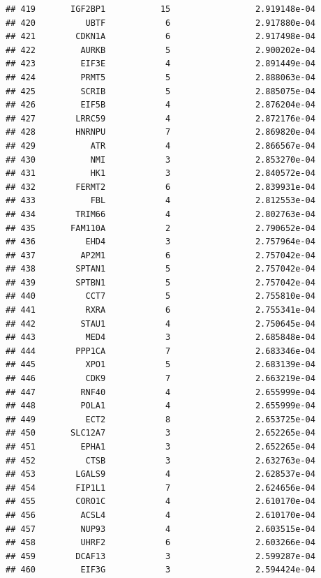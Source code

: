 \documentclass[
]{article}
\begin{document}
\begin{verbatim}
## 419       IGF2BP1           15                 2.919148e-04
## 420          UBTF            6                 2.917880e-04
## 421        CDKN1A            6                 2.917498e-04
## 422         AURKB            5                 2.900202e-04
## 423         EIF3E            4                 2.891449e-04
## 424         PRMT5            5                 2.888063e-04
## 425         SCRIB            5                 2.885075e-04
## 426         EIF5B            4                 2.876204e-04
## 427        LRRC59            4                 2.872176e-04
## 428        HNRNPU            7                 2.869820e-04
## 429           ATR            4                 2.866567e-04
## 430           NMI            3                 2.853270e-04
## 431           HK1            3                 2.840572e-04
## 432        FERMT2            6                 2.839931e-04
## 433           FBL            4                 2.812553e-04
## 434        TRIM66            4                 2.802763e-04
## 435       FAM110A            2                 2.790652e-04
## 436          EHD4            3                 2.757964e-04
## 437         AP2M1            6                 2.757042e-04
## 438        SPTAN1            5                 2.757042e-04
## 439        SPTBN1            5                 2.757042e-04
## 440          CCT7            5                 2.755810e-04
## 441          RXRA            6                 2.755341e-04
## 442         STAU1            4                 2.750645e-04
## 443          MED4            3                 2.685848e-04
## 444        PPP1CA            7                 2.683346e-04
## 445          XPO1            5                 2.683139e-04
## 446          CDK9            7                 2.663219e-04
## 447         RNF40            4                 2.655999e-04
## 448         POLA1            4                 2.655999e-04
## 449          ECT2            8                 2.653725e-04
## 450       SLC12A7            3                 2.652265e-04
## 451         EPHA1            3                 2.652265e-04
## 452          CTSB            3                 2.632763e-04
## 453        LGALS9            4                 2.628537e-04
## 454        FIP1L1            7                 2.624656e-04
## 455        CORO1C            4                 2.610170e-04
## 456         ACSL4            4                 2.610170e-04
## 457         NUP93            4                 2.603515e-04
## 458         UHRF2            6                 2.603266e-04
## 459        DCAF13            3                 2.599287e-04
## 460         EIF3G            3                 2.594424e-04

\end{verbatim}
\end{document}

